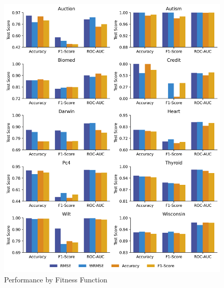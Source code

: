 
    \begin{figure}[h]
    \centering
    \includegraphics[width=\linewidth]{../Latex/Chapters/Figures/Results/fitness_performance.png}
    \caption{Performance by Fitness Function}
    \label{fig:performance}
    \end{figure}
    